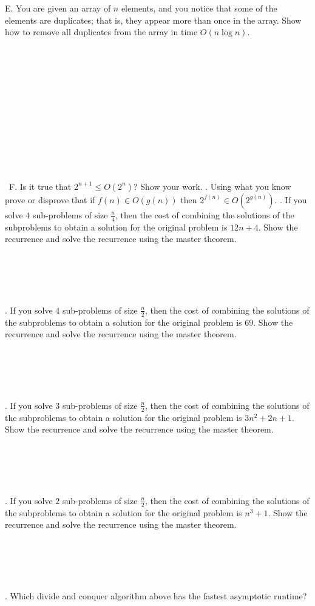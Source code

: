 \documentclass[12pt]{article}
\begin{document}
\noindent E. You are given an array of $n$ elements, and you notice that 
some of the elements are duplicates; that is, they appear more 
than once in the array. Show how to remove all duplicates from 
the array in time $O(n \log{n})$.\\\\\\\\\\\\\\\\\\\\\\\\\\\
\noindent F. Is it true that $2^{n+1} \leq O(2^n)$? Show your work.
\newpage 
{}. Using what you know prove or disprove that if $f(n) \in O(g(n))$ then $2^{f(n)}\in O(2^{g(n)})$.
\newpage
{}. If you solve $4$ sub-problems of size $\frac{n}{4}$, then the cost of combining the solutions of the subproblems to obtain a solution for the original problem is $12n+4$. Show the recurrence and solve the recurrence using the master theorem.\\\\\\\\\\\\
\noindent 12. If you solve $4$ sub-problems of size $\frac{n}{2}$, then the cost of combining the solutions of the subproblems to obtain a solution for the original problem is $69$. Show the recurrence and solve the recurrence using the master theorem.\\\\\\\\\\\\
\noindent 13. If you solve $3$ sub-problems of size $\frac{n}{2}$, then the cost of combining the solutions of the subproblems to obtain a solution for the original problem is $3n^2+2n+1$. Show the recurrence and solve the recurrence using the master theorem.\\\\\\\\\\\\
\noindent 14. If you solve $2$ sub-problems of size $\frac{n}{2}$, then the cost of combining the solutions of the subproblems to obtain a solution for the original problem is $n^3+1$. Show the recurrence and solve the recurrence using the master theorem.\\\\\\\\\\\\
\noindent 15. Which divide and conquer algorithm above has the fastest asymptotic runtime?
\end{document}
